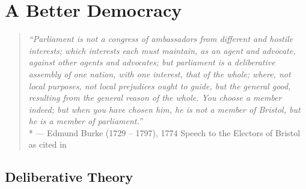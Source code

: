 
\chapter[Better Democracy]{A Better Democracy} \label{chap:better-democracy} 

\begin{quote}
	\emph{``Parliament is not a congress of ambassadors from different and hostile interests; which interests each must maintain, as an agent and advocate, against other agents and advocates; but parliament is a deliberative assembly of one nation, with one interest, that of the whole; where, not local purposes, not local prejudices ought to guide, but the general good, resulting from the general reason of the whole. You choose a member indeed; but when you have chosen him, he is not a member of Bristol, but he is a member of parliament.''}\\*
	--- Edmund Burke (1729 -- 1797), 1774 Speech to the Electors of Bristol as cited in \citep{Burke1886}
\end{quote}





\section{Deliberative Theory}



